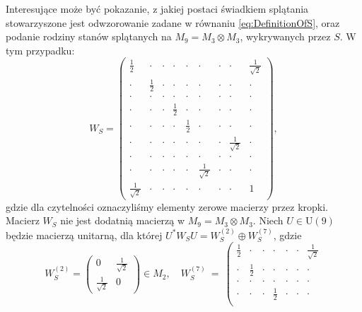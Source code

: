 {Interesujące może być pokazanie, z jakiej postaci świadkiem splątania
stowarzyszone jest odwzorowanie zadane w równaniu \eqref{eq:DefinitionOfS},
oraz podanie rodziny stanów splątanych na
$M_{9} = M_{3} \! \otimes \! M_{3}$, wykrywanych przez $S$.
W tym przypadku:
\begin{equation}
\label{WS-C}
 W_S =  \left( \begin{array}{ccc|ccc|ccc}
 \frac{1}{2} &  \cdot& \cdot& \cdot& \cdot& \cdot& \cdot& \cdot& \frac{1}{\sqrt{2}} \\
 \cdot& \frac{1}{2} &\cdot& \cdot& \cdot& \cdot& \cdot& \cdot& \cdot\\
 \cdot& \cdot& \cdot & \cdot& \cdot& \cdot& \cdot& \cdot& \cdot  \\ \hline
 \cdot& \cdot& \cdot& \frac{1}{2} & \cdot& \cdot& \cdot& \cdot&  \cdot \\
 \cdot& \cdot& \cdot& \cdot& \frac{1}{2} & \cdot& \cdot& \cdot&  \cdot \\
 \cdot& \cdot& \cdot& \cdot& \cdot& \cdot& \cdot & \frac{1}{\sqrt{2}}& \cdot  \\ \hline
 \cdot& \cdot& \cdot & \cdot& \cdot& \cdot& \cdot& \cdot& \cdot  \\
 \cdot & \cdot& \cdot& \cdot& \cdot& \frac{1}{\sqrt{2}}& \cdot& \cdot& \cdot \\
 \frac{1}{\sqrt{2}}& \cdot& \cdot& \cdot& \cdot & \cdot& \cdot& \cdot& 1
  \end{array} \right),
\end{equation}
gdzie dla czytelności oznaczyliśmy elementy zerowe macierzy przez kropki.
Macierz $W_{S}$ nie jest dodatnią macierzą w
$M_{9} = M_{3} \! \otimes \! M_{3}$.
Niech $U \in \text{U}(9)$ będzie macierzą unitarną, dla której
$U^{*} W_{S} U = W_{S}^{(2)} \oplus W_{S}^{(7)}$,
gdzie
\begin{equation}
\label{WS-DirectSum}
 W_{S}^{(2)} = \left(\begin{array}{cc}
    0 & \frac{1}{\sqrt{2}}  \\ \frac{1}{\sqrt{2}}  & 0
  \end{array}\right) \in M_{2}, \quad
 W_S^{(7)}\ = \  \left( \begin{array}{ccccccc}
 \frac{1}{2} &  \cdot& \cdot& \cdot& \cdot& \cdot& \frac{1}{\sqrt{2}} \\
 \cdot& \frac{1}{2} &\cdot& \cdot& \cdot& \cdot& \cdot\\
 \cdot& \cdot& \cdot & \cdot& \cdot& \cdot& \cdot \\
 \cdot& \cdot& \cdot& \frac{1}{2} & \cdot&  \cdot& \cdot \\

\end{array}
\end{equation}}
